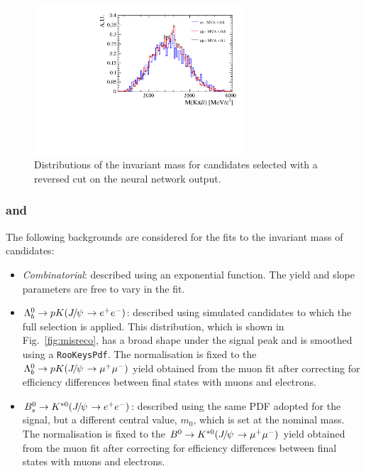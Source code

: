 \begin{figure}[t!]
\vspace{2cm}

\centering
\includegraphics[width=0.7\textwidth]{RKst/figs/Background/highq2_comb.pdf}
\caption{Distributions of the \mKpill invariant mass for \BdToKstll candidates selected with a reversed cut on the neural network output.}
\label{fig:highq2_comb}
\end{figure}

\subsubsection*{\BdToKstJPs and \BdToKstPsi}

The following backgrounds are considered for the fits to the invariant mass of \mbox{\BdToKstJPsee} candidates:
%
\begin{itemize}

\item \textit{Combinatorial}: described using an exponential function. The yield and slope parameters are free to vary in the fit.

\item $\Lb\to pK(\jpsi\to\ee)$: described using simulated candidates to which the full selection is applied. This distribution,
which is shown in Fig.~\ref{fig:misreco}, has a broad 
shape under the signal peak and is smoothed using a \texttt{RooKeysPdf}. The normalisation is fixed to the 
$\Lb\to pK(\jpsi\to\mumu)$ yield obtained from the muon fit after correcting for efficiency differences 
between final states with muons and electrons.

\item $\Bs\to\Kstarz(\jpsi\to\ee)$: described using the same PDF adopted for the signal, but a different central value, 
$m_0$, which is set at the \Bs nominal mass. The normalisation is fixed to the $\Bd\to\Kstarz(\jpsi\to\mumu)$ yield 
obtained from the muon fit after correcting for efficiency differences between final states with muons and electrons.

\end{itemize}

